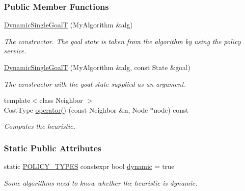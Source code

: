 \subsubsection*{Public Member Functions}
\begin{DoxyCompactItemize}
\item 
\hyperlink{structslb_1_1ext_1_1policy_1_1heuristic_1_1DynamicSingleGoalT_a58cc6e48f69e101a3c1d20e23ff643a4}{Dynamic\+Single\+GoalT} (My\+Algorithm \&alg)
\begin{DoxyCompactList}\small\item\em The constructor. The goal state is taken from the algorithm by using the policy service. \end{DoxyCompactList}\item 
\hyperlink{structslb_1_1ext_1_1policy_1_1heuristic_1_1DynamicSingleGoalT_a97461ead765eae5d7f184641a832c9b1}{Dynamic\+Single\+GoalT} (My\+Algorithm \&alg, const State \&goal)
\begin{DoxyCompactList}\small\item\em The constructor with the goal state supplied as an argument. \end{DoxyCompactList}\item 
{\footnotesize template$<$class Neighbor $>$ }\\Cost\+Type \hyperlink{structslb_1_1ext_1_1policy_1_1heuristic_1_1DynamicSingleGoalT_ab2839e7036a9450c47aa91316afbaee1}{operator()} (const Neighbor \&n, Node $\ast$node) const 
\begin{DoxyCompactList}\small\item\em Computes the heuristic. \end{DoxyCompactList}\end{DoxyCompactItemize}
\subsubsection*{Static Public Attributes}
\begin{DoxyCompactItemize}
\item 
static \hyperlink{extensions_2shared__policies_2headers_8h_ae70a06fa4631780beea14971eb36a562}{P\+O\+L\+I\+C\+Y\+\_\+\+T\+Y\+P\+ES} constexpr bool \hyperlink{structslb_1_1ext_1_1policy_1_1heuristic_1_1DynamicSingleGoalT_adfa4593a8649a83f4d572d3c2ac3b2ec}{dynamic} = true\hypertarget{structslb_1_1ext_1_1policy_1_1heuristic_1_1DynamicSingleGoalT_adfa4593a8649a83f4d572d3c2ac3b2ec}{}\label{structslb_1_1ext_1_1policy_1_1heuristic_1_1DynamicSingleGoalT_adfa4593a8649a83f4d572d3c2ac3b2ec}

\begin{DoxyCompactList}\small\item\em Some algorithms need to know whether the heuristic is dynamic. \end{DoxyCompactList}\end{DoxyCompactItemize}
